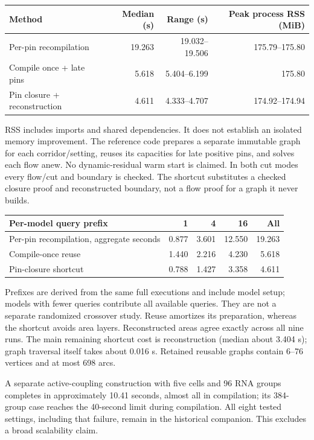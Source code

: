 \documentclass[10pt,letterpaper]{article}
\begin{document}
\begin{center}
\begin{tabular}{lrrr}\toprule
Method & Median (s) & Range (s) & Peak process RSS (MiB)\\\midrule
Per-pin recompilation &19.263&19.032--19.506&175.79--175.80\\
Compile once + late pins &5.618&5.404--6.199&175.80\\
Pin closure + reconstruction &4.611&4.333--4.707&174.92--174.94\\\bottomrule
\end{tabular}
\end{center}
RSS includes imports and shared dependencies. It does not establish an isolated memory improvement. The reference code prepares a separate immutable graph for each corridor/setting, reuses its capacities for late positive pins, and solves each flow anew. No dynamic-residual warm start is claimed. In both cut modes every flow/cut and boundary is checked. The shortcut substitutes a checked closure proof and reconstructed boundary, not a flow proof for a graph it never builds.

\begin{center}
\begin{tabular}{lrrrr}\toprule
Per-model query prefix &1&4&16&All\\\midrule
Per-pin recompilation, aggregate seconds &0.877&3.601&12.550&19.263\\
Compile-once reuse &1.440&2.216&4.230&5.618\\
Pin-closure shortcut &0.788&1.427&3.358&4.611\\\bottomrule
\end{tabular}
\end{center}
Prefixes are derived from the same full executions and include model setup; models with fewer queries contribute all available queries. They are not a separate randomized crossover study. Reuse amortizes its preparation, whereas the shortcut avoids area layers. Reconstructed areas agree exactly across all nine runs. The main remaining shortcut cost is reconstruction (median about 3.404 s); graph traversal itself takes about 0.016 s. Retained reusable graphs contain 6--76 vertices and at most 698 arcs.

A separate active-coupling construction with five cells and 96 RNA groups completes in approximately 10.41 seconds, almost all in compilation; its 384-group case reaches the 40-second limit during compilation. All eight tested settings, including that failure, remain in the historical companion. This excludes a broad scalability claim.
\end{document}

